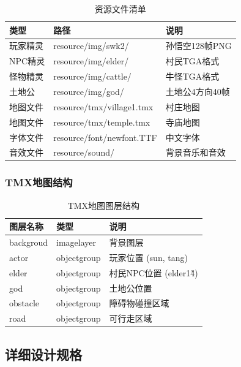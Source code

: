 \documentclass[12pt,a4paper]{article}
\begin{document}
\begin{table}[H]
\centering
\caption{资源文件清单}
\renewcommand{\arraystretch}{1.3}
\begin{tabularx}{\textwidth}{>{\centering\arraybackslash}m{3cm}>{\centering\arraybackslash}m{4cm}>{\centering\arraybackslash}m{5cm}}
\toprule
\textbf{类型} & \textbf{路径} & \textbf{说明} \\
\midrule
玩家精灵 & resource/img/swk2/ & 孙悟空128帧PNG \\
NPC精灵 & resource/img/elder/ & 村民TGA格式 \\
怪物精灵 & resource/img/cattle/ & 牛怪TGA格式 \\
土地公 & resource/img/god/ & 土地公4方向40帧 \\
地图文件 & resource/tmx/village1.tmx & 村庄地图 \\
地图文件 & resource/tmx/temple.tmx & 寺庙地图 \\
字体文件 & resource/font/newfont.TTF & 中文字体 \\
音效文件 & resource/sound/ & 背景音乐和音效 \\
\bottomrule
\end{tabularx}
\end{table}

\subsubsection{TMX地图结构}

\begin{table}[H]
\centering
\caption{TMX地图图层结构}
\renewcommand{\arraystretch}{1.3}
\begin{tabularx}{\textwidth}{>{\centering\arraybackslash}m{3cm}>{\centering\arraybackslash}m{3cm}>{\centering\arraybackslash}m{5cm}}
\toprule
\textbf{图层名称} & \textbf{类型} & \textbf{说明} \\
\midrule
backgroud & imagelayer & 背景图层 \\
actor & objectgroup & 玩家位置 (sun, tang) \\
elder & objectgroup & 村民NPC位置 (elder1\~4) \\
god & objectgroup & 土地公位置 \\
obstacle & objectgroup & 障碍物碰撞区域 \\
road & objectgroup & 可行走区域 \\
\bottomrule
\end{tabularx}
\end{table}

\subsection{详细设计规格}
\end{document}
